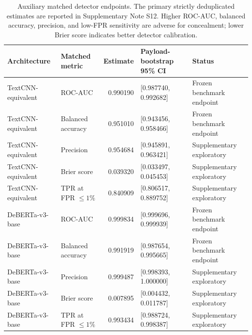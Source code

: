\documentclass[fleqn,10pt]{wlscirep}
\begin{document}
\begin{table}[H]
\centering
\small
\begin{tabularx}{\textwidth}{L{0.24\textwidth}L{0.17\textwidth}r L{0.25\textwidth}Y}
\toprule
Architecture & Matched metric & Estimate & Payload-bootstrap 95\% CI & Status \\
\midrule
TextCNN-equivalent & ROC-AUC & 0.990190 & [0.987740, 0.992682] & Frozen benchmark endpoint \\
TextCNN-equivalent & Balanced accuracy & 0.951010 & [0.943456, 0.958466] & Frozen benchmark endpoint \\
TextCNN-equivalent & Precision & 0.954684 & [0.945891, 0.963421] & Supplementary exploratory \\
TextCNN-equivalent & Brier score & 0.039320 & [0.033497, 0.045453] & Supplementary exploratory \\
TextCNN-equivalent & TPR at FPR \(\leq1\%\) & 0.840909 & [0.806517, 0.889752] & Supplementary exploratory \\
DeBERTa-v3-base & ROC-AUC & 0.999834 & [0.999696, 0.999939] & Frozen benchmark endpoint \\
DeBERTa-v3-base & Balanced accuracy & 0.991919 & [0.987654, 0.995665] & Frozen benchmark endpoint \\
DeBERTa-v3-base & Precision & 0.999487 & [0.998393, 1.000000] & Supplementary exploratory \\
DeBERTa-v3-base & Brier score & 0.007895 & [0.004432, 0.011787] & Supplementary exploratory \\
DeBERTa-v3-base & TPR at FPR \(\leq1\%\) & 0.993434 & [0.988724, 0.998387] & Supplementary exploratory \\
\bottomrule
\end{tabularx}
\caption{\label{tab:detector-matched} Auxiliary matched detector endpoints. The primary strictly deduplicated estimates are reported in Supplementary Note S12.   Higher ROC-AUC, balanced accuracy, precision, and low-FPR sensitivity are adverse for concealment; lower Brier score indicates better detector calibration.}
\end{table}
\end{document}
